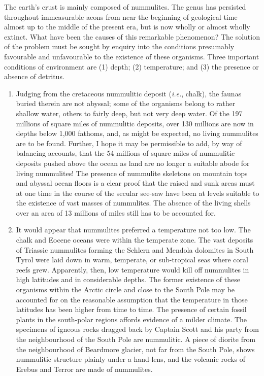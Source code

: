 \documentclass[a4paper, 12pt, oneside]{article}
\begin{document}
The earth's crust is mainly composed of nummulites. The genus has persisted throughout immeasurable aeons from near the beginning of geological time almost up to the middle of the present era, but is now wholly or almost wholly extinct. What have been the causes of this remarkable phenomenon? The solution of the problem must be sought by enquiry into the conditions presumably favourable and unfavourable to the existence of these organisms. Three important conditions of environment are (1) depth; (2) temperature; and (3) the presence or absence of detritus.
\begin{enumerate}
    \item Judging from the cretaceous nummulitic deposit (\emph{i.e.}, chalk), the faunas buried therein are not abyssal; some of the organisms belong to rather shallow water, others to fairly deep, but not very deep water. Of the 197 millions of square miles of nummulitic deposits, over 130 millions are now in depths below 1,000 fathoms, and, as might be expected, no living nummulites are to be found. Further, I hope it may be permissible to add, by way of balancing accounts, that the 54 millions of square miles of nummulitic deposits pushed above the ocean as land are no longer a suitable abode for living nummulites! The presence of nummulite skeletons on mountain tops and abyssal ocean floors is a clear proof that the raised and sunk areas must at one time in the course of the secular see-saw have been at levels suitable to the existence of vast masses of nummulites. The absence of the living shells over an area of 13 millions of miles still has to be accounted for.
    \item It would appear that nummulites preferred a temperature not too low. The chalk and Eocene oceans were within the temperate zone. The vast deposits of Triassic nummulites forming the Schlern and Mendola dolomites in South Tyrol were laid down in warm, temperate, or sub-tropical seas where coral reefs grew. Apparently, then, low temperature would kill off nummulites in high latitudes and in considerable depths. The former existence of these organisms within the Arctic circle and close to the South Pole may be accounted for on the reasonable assumption that the temperature in those latitudes has been higher from time to time. The presence of certain fossil plants in the south-polar regions affords evidence of a milder climate. The specimens of igneous rocks dragged back by Captain Scott and his party from the neighbourhood of the South Pole are nummulitic. A piece of diorite from the neighbourhood of Beardmore glacier, not far from the South Pole, shows nummulitic structure plainly under a hand-lens, and the volcanic rocks of Erebus and Terror are made of nummulites.
\end{enumerate}
\end{document}
